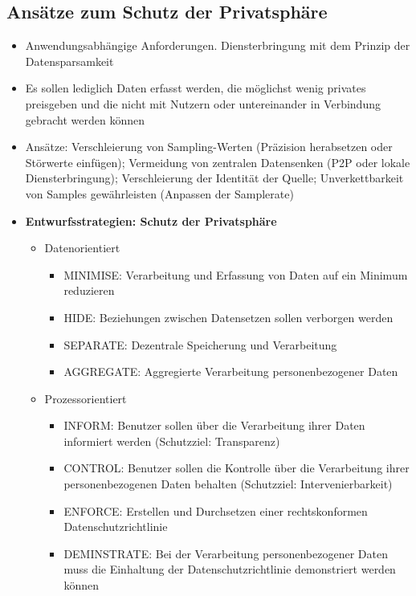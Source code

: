 \subsection{Ansätze zum Schutz der Privatsphäre}
\begin{itemize}
	\item Anwendungsabhängige Anforderungen. Diensterbringung mit dem Prinzip der Datensparsamkeit
	\item Es sollen lediglich Daten erfasst werden, die möglichst wenig privates preisgeben und die nicht mit Nutzern oder untereinander in Verbindung gebracht werden können
	\item Ansätze: Verschleierung von Sampling-Werten (Präzision herabsetzen oder Störwerte einfügen); Vermeidung von zentralen Datensenken (P2P oder lokale Diensterbringung); Verschleierung der Identität der Quelle; Unverkettbarkeit von Samples gewährleisten (Anpassen der Samplerate)
	\item \textbf{Entwurfsstrategien: Schutz der Privatsphäre}
	\begin{itemize}
		\item Datenorientiert
		\begin{itemize}
			\item MINIMISE: Verarbeitung und Erfassung von Daten auf ein Minimum reduzieren
			\item HIDE: Beziehungen zwischen Datensetzen sollen verborgen werden
			\item SEPARATE: Dezentrale Speicherung und Verarbeitung
			\item AGGREGATE: Aggregierte Verarbeitung personenbezogener Daten
		\end{itemize}
		\item Prozessorientiert
		\begin{itemize}
			\item INFORM: Benutzer sollen über die Verarbeitung ihrer Daten informiert werden (Schutzziel: Transparenz)
			\item CONTROL: Benutzer sollen die Kontrolle über die Verarbeitung ihrer personenbezogenen Daten behalten (Schutzziel: Intervenierbarkeit)
			\item ENFORCE: Erstellen und Durchsetzen einer rechtskonformen Datenschutzrichtlinie
			\item DEMINSTRATE: Bei der Verarbeitung personenbezogener Daten muss die Einhaltung der Datenschutzrichtlinie demonstriert werden können
		\end{itemize}
	\end{itemize}
\end{itemize}


